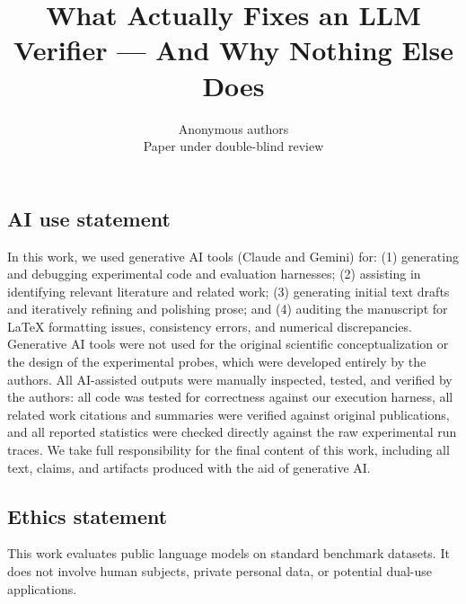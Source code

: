\documentclass{article} %
\title{What Actually Fixes an LLM Verifier --- And Why Nothing Else Does}
\author{Anonymous authors \\
Paper under double-blind review}
\begin{document}
\maketitle















\subsection*{AI use statement}
In this work, we used generative AI tools (Claude and Gemini) for:
(1) generating and debugging experimental code and evaluation harnesses;
(2) assisting in identifying relevant literature and related work;
(3) generating initial text drafts and iteratively refining and polishing prose; and
(4) auditing the manuscript for \LaTeX{} formatting issues, consistency errors, and numerical discrepancies.
Generative AI tools were not used for the original scientific conceptualization or the design of the experimental probes, which were developed entirely by the authors. 
All AI-assisted outputs were manually inspected, tested, and verified by the authors: all code was tested for correctness against our execution harness, all related work citations and summaries were verified against original publications, and all reported statistics were checked directly against the raw experimental run traces. 
We take full responsibility for the final content of this work, including all text, claims, and artifacts produced with the aid of generative AI.

\subsection*{Ethics statement}
This work evaluates public language models on standard benchmark datasets. It does not involve human subjects, private personal data, or potential dual-use applications.






\appendix


\end{document}
